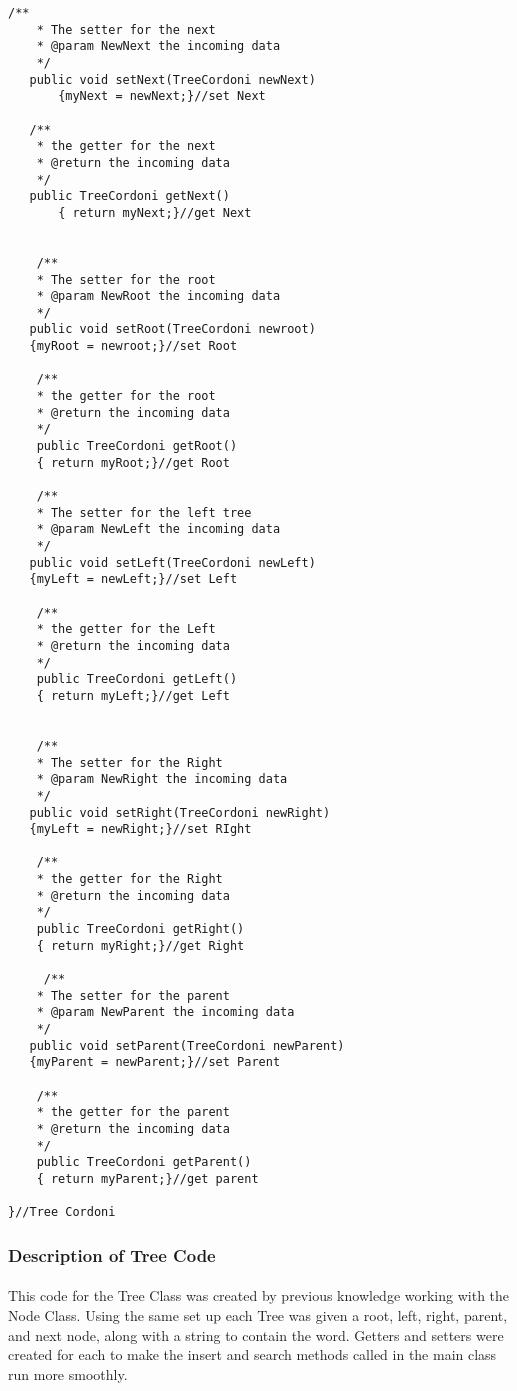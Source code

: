 \documentclass[letterpaper, 10pt,DIV=13]{scrartcl}
\numberwithin{equation}{section} %
\numberwithin{figure}{section} %
\numberwithin{table}{section} %
\begin{document}
\begin{lstlisting}[frame=single, ]
   /**
    * The setter for the next
    * @param NewNext the incoming data
    */
   public void setNext(TreeCordoni newNext)
       {myNext = newNext;}//set Next
   
   /**
    * the getter for the next
    * @return the incoming data
    */
   public TreeCordoni getNext()
       { return myNext;}//get Next


    /**
    * The setter for the root
    * @param NewRoot the incoming data
    */
   public void setRoot(TreeCordoni newroot)
   {myRoot = newroot;}//set Root

    /**
    * the getter for the root
    * @return the incoming data
    */
    public TreeCordoni getRoot()
    { return myRoot;}//get Root

    /**
    * The setter for the left tree
    * @param NewLeft the incoming data
    */
   public void setLeft(TreeCordoni newLeft)
   {myLeft = newLeft;}//set Left

    /**
    * the getter for the Left
    * @return the incoming data
    */
    public TreeCordoni getLeft()
    { return myLeft;}//get Left


    /**
    * The setter for the Right
    * @param NewRight the incoming data
    */
   public void setRight(TreeCordoni newRight)
   {myLeft = newRight;}//set RIght

    /**
    * the getter for the Right
    * @return the incoming data
    */
    public TreeCordoni getRight()
    { return myRight;}//get Right

     /**
    * The setter for the parent
    * @param NewParent the incoming data
    */
   public void setParent(TreeCordoni newParent)
   {myParent = newParent;}//set Parent

    /**
    * the getter for the parent
    * @return the incoming data
    */
    public TreeCordoni getParent()
    { return myParent;}//get parent

}//Tree Cordoni
\end{lstlisting}

\subsubsection{Description of Tree Code}
\paragraph{} This code for the Tree Class was created by previous knowledge working with the Node Class. Using the same set up each Tree was given a root, left, right, parent, and next node, along with a string to contain the word. Getters and setters were created for each to make the insert and search methods called in the main class run more smoothly. 
\end{document}
